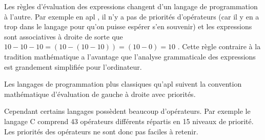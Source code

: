 {\begin{minipage}{\myparboxwidth}
\smallskip

Les règles d'évaluation des expressions changent d'un langage de programmation à l'autre.
Par exemple en {\sc apl} \cite{iverson1}, il n'y a pas de priorités d'opérateurs (car il y en a
trop dans le langage pour qu'on puisse espérer s'en souvenir) et les expressions sont associatives 
à droite de sorte que $10 - 10 - 10 = (10 - (10 - 10)) = (10 - 0) = 10$ . Cette règle contraire
à la tradition mathématique a l'avantage que l'analyse grammaticale des expressions est grandement
simplifiée pour l'ordinateur. 

Les langages de programmation plus classiques qu'{\sc apl} sui\-vent la convention
mathématique d'évaluation de gauche à droite avec priorités.


Cependant certains langages possèdent beaucoup d'opérateurs.
Par exemple le langage {\sc C} \cite{kernighan1} comprend 43 opérateurs différents répartis en
15 niveaux de prio\-ri\-té.
Les priorités des opérateurs ne sont donc pas faciles à retenir.

\vspace{\abovedisplayskip}
\end{minipage}
}
\noindent {}
